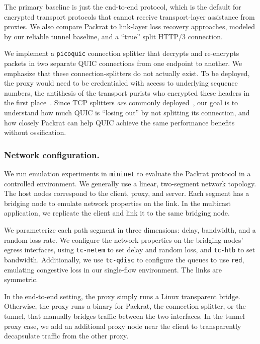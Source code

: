 The primary baseline is just the end-to-end protocol, which is the default for
encrypted transport protocols that cannot receive transport-layer assistance
from proxies.
We also compare Packrat to link-layer loss recovery approaches, modeled by
our reliable tunnel baseline, and a ``true'' split HTTP/3 connection.

We implement a \texttt{picoquic} connection splitter that decrypts
and re-encrypts packets in two separate QUIC connections from one endpoint to
another. We emphasize that these connection-splitters do not actually exist. To
be deployed, the proxy would need to be credentialed with access to underlying
sequence numbers, the antithesis of the transport purists who encrypted these
headers in the first place~\cite{duke2023rfc}. Since TCP splitters \textit
{are} commonly deployed~\cite{honda2011still,rfc3135}, our goal is to
understand how much QUIC is ``losing out'' by not splitting its connection, and
how closely Packrat can help QUIC achieve the same performance benefits without
ossification.

\subsubsection{Network configuration.}

We run emulation experiments in \texttt{mininet} to evaluate the Packrat protocol
in a controlled environment. We generally use a linear, two-segment network
topology.
The host nodes
correspond to the client, proxy, and server. Each segment has a bridging
node to emulate network properties on the link. In the multicast application,
we replicate the client and link it to the same bridging node.

We parameterize each path segment in three dimensions: delay, bandwidth, and a
random loss rate. We configure the network properties on the bridging nodes’
egress interfaces, using \texttt{tc-netem} to set delay and random loss,
and \texttt{tc-htb} to set bandwidth. Additionally, we use \texttt{tc-qdisc} to
configure the queues to use \texttt{red}, emulating congestive loss in our
single-flow environment. The links are symmetric.

In the end-to-end setting, the proxy simply runs a Linux transparent bridge.
Otherwise, the
proxy runs a binary for Packrat, the connection splitter, or the tunnel, that
manually bridges traffic between the two interfaces.
In the tunnel proxy case, we add an additional proxy
node near the client to transparently decapsulate traffic from the other
proxy.

